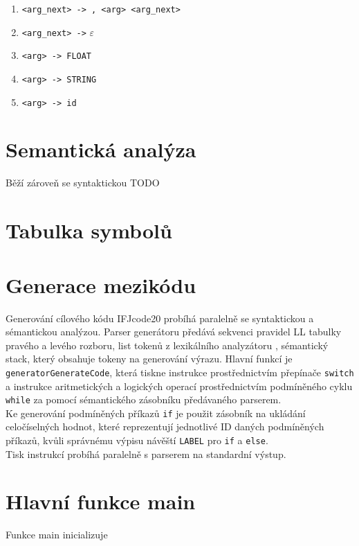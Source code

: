 \documentclass[a4paper, 12pt]{article}
\begin{document}
\begin{enumerate}[noitemsep]
            \item \verb|<arg_next> -> , <arg> <arg_next>|
            \item \verb|<arg_next> ->| $\varepsilon$
            \item \verb|<arg> -> FLOAT|
            \item \verb|<arg> -> STRING|
            \item \verb|<arg> -> id| 
            
            
            
        \end{enumerate} 
\newpage

\section{Semantická analýza}
Běží zároveň se syntaktickou TODO

\newpage

\section{Tabulka symbolů}

\newpage

\section{Generace mezikódu}
Generování cílového kódu IFJcode20 probíhá paralelně se syntaktickou a sémantickou analýzou. Parser generátoru předává sekvenci pravidel LL tabulky pravého a levého rozboru, list tokenů z lexikálního analyzátoru , sémantický stack, který obsahuje tokeny na generování výrazu. Hlavní funkcí je \verb|generatorGenerateCode|, která tiskne instrukce prostřednictvím přepínače \verb|switch| a instrukce aritmetických a logických operací prostřednictvím podmíněného cyklu \verb|while| za pomocí sémantického zásobníku předávaného parserem.\\
\newline
Ke generování podmíněných příkazů \verb|if| je použit zásobník na ukládání celočíselných hodnot, které reprezentují jednotlivé ID daných podmíněných příkazů, kvůli správnému výpisu návěští \verb|LABEL| pro \verb|if| a \verb|else|. \\
\newline
Tisk instrukcí probíhá paralelně s parserem na standardní výstup.

\newpage

\section{Hlavní funkce main}
Funkce main inicializuje 
\end{document}
